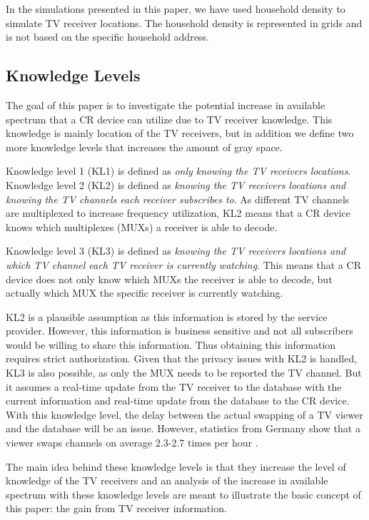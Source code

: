 \documentclass[journal,11pt,draftclsnofoot,onecolumn]{IEEEtran}
\begin{document}
In the simulations presented in this paper, we have used household density to simulate TV receiver locations. The household density is represented in grids and is not based on the specific household address. 

\subsection{Knowledge Levels}
The goal of this paper is to investigate the potential increase in available spectrum that a CR device can utilize due to TV receiver knowledge. This knowledge is mainly location of the TV receivers, but in addition we define two more knowledge levels that increases the amount of gray space.

Knowledge level 1 (KL1) is defined as \textit{only knowing the TV receivers locations}. Knowledge level 2 (KL2) is defined as \textit{knowing the TV receivers locations and knowing the TV channels each receiver subscribes to}. As different TV channels are multiplexed to increase frequency utilization, KL2 means that a CR device knows which multiplexes (MUXs) a receiver is able to decode.

Knowledge level 3 (KL3) is defined as \textit{knowing the TV receivers locations and which TV channel each TV receiver is currently watching}. This means that a CR device does not only know which MUXs the receiver is able to decode, but actually which MUX the specific receiver is currently watching.

KL2 is a plausible assumption as this information is stored by the service provider. However, this information is business sensitive and not all subscribers would be willing to share this information. Thus obtaining this information requires strict authorization. Given that the privacy issues with KL2 is handled, KL3 is also possible, as only the MUX needs to be reported the TV channel. But it assumes a real-time update from the TV receiver to the database with the current information and real-time update from the database to the CR device. With this knowledge level, the delay between the actual swapping of a TV viewer and the database will be an issue. However, statistics from Germany show that a viewer swaps channels on average 2.3-2.7 times per hour \cite{swapping}.

The main idea behind these knowledge levels is that they increase the level of knowledge of the TV receivers and an analysis of the increase in available spectrum with these knowledge levels are meant to illustrate the basic concept of this paper: the gain from TV receiver information.
\end{document}
